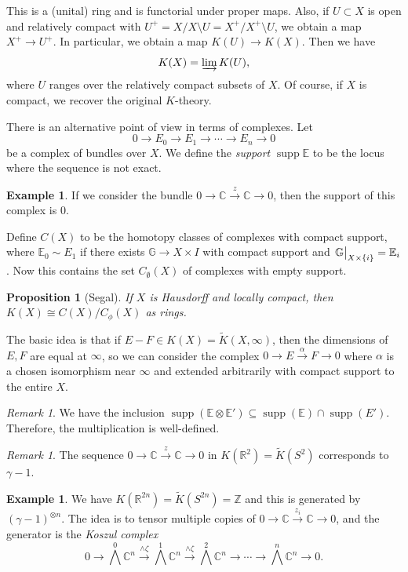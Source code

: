 \documentclass[leqno, openany]{memoir}
\newtheorem{prop}[thm]{Proposition}
\theoremstyle{definition}
\newtheorem{exm}[thm]{Example}
\theoremstyle{remark}
\newtheorem{rmk}[thm]{Remark}
\theoremstyle{plain}
\theoremstyle{definition}
\theoremstyle{remark}
\newcommand{\R}{\mathbb{R}}
\newcommand{\C}{\mathbb{C}}
\newcommand{\E}{\mathbb{E}}
\newcommand{\Z}{\mathbb{Z}}
\newcommand{\wt}[1]{\widetilde{#1}}
\DeclareMathOperator{\supp}{supp}
\begin{document}
This is a (unital) ring and is functorial under proper maps. Also, if $U
\subset X$ is open and relatively compact with $U^+ = X / X \setminus U = X^+ /
X^+ \setminus U$, we obtain a map $X^+ \to U^+$. In particular, we obtain a map
$K(U) \to K(X)$. Then we have \[ K(X) = \varinjlim K(U), \] where $U$ ranges
over the relatively compact subsets of $X$. Of course, if $X$ is compact, we
recover the original $K$-theory.

There is an alternative point of view in terms of complexes. Let \[ 0 \to E_0
\to E_1 \to \cdots \to E_n \to 0 \] be a complex of bundles over $X$. We define
the \textit{support} $\supp \mathbb{E}$ to be the locus where the sequence is
not exact.

\begin{exm} If we consider the bundle $0 \to \C \xrightarrow{z} \C \to 0$, then
the support of this complex is $\qty{0}$.  \end{exm}

Define $C(X)$ to be the homotopy classes of complexes with compact support,
where $\E_0 \sim E_1$ if there exists $\mathbb{G} \to X \times I$ with compact
support and $\eval{\mathbb{G}}_{X \times \qty{i}} = \E_i$. Now this contains
the set $C_{\emptyset}(X)$ of complexes with empty support. 

\begin{prop}[Segal] If $X$ is Hausdorff and locally compact, then $K(X) \cong
C(X) / C_{\phi}(X)$ as rings.  \end{prop}

The basic idea is that if $E - F \in K(X) = \wt{K}(X, \infty)$, then the
dimensions of $E, F$ are equal at $\infty$, so we can consider the complex $0
\to E \xrightarrow{\alpha} F \to 0$ where $\alpha$ is a chosen isomorphism near
$\infty$ and extended arbitrarily with compact support to the entire $X$.

\begin{rmk} We have the inclusion $\supp(\E \otimes \E') \subseteq \supp(\E)
\cap \supp(E')$. Therefore, the multiplication is well-defined.  \end{rmk}

\begin{rmk} The sequence $0 \to \C \xrightarrow{z} \C \to 0$ in $K(\R^2) =
\wt{K}(S^2)$ corresponds to $\gamma - 1$.  \end{rmk}

\begin{exm} We have $K(\R^{2n}) = \wt{K}(S^{2n}) = \Z$ and this is generated by
    ${(\gamma-1)}^{\otimes n}$. The idea is to tensor multiple copies of $0 \to
    \C \xrightarrow{z_i} \C \to 0$, and the generator is the \textit{Koszul
    complex} \[ 0 \to {\bigwedge}^0 \C^n \xrightarrow{\wedge \zeta}
    {\bigwedge}^1 \C^n \xrightarrow{\wedge \zeta} {\bigwedge}^2 \C^n \to \cdots
\to {\bigwedge}^n \C^n \to 0. \] \end{exm}
\end{document}
